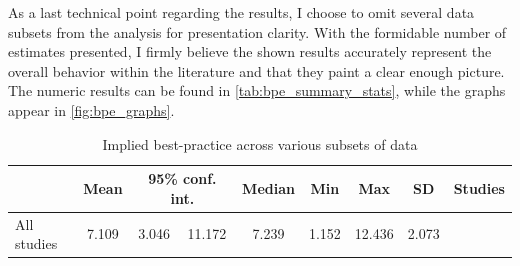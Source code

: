 As a last technical point regarding the results, I choose to omit several data subsets from the analysis for presentation clarity. With the formidable number of estimates presented, I firmly believe the shown results accurately represent the overall behavior within the literature and that they paint a clear enough picture. The numeric results can be found in \autoref{tab:bpe_summary_stats}, while the graphs appear in \autoref{fig:bpe_graphs}.


\begin{table}[!htbp]
\centering
\scriptsize
\singlespace
\caption{Implied best-practice across various subsets of data}
\label{tab:bpe_summary_stats}
\begin{tabular}{
@{}
l %
*{7}{c} %
>{\centering\arraybackslash}p{1cm} %
@{}
}
\toprule
    & Mean & \multicolumn{2}{c}{95\% conf. int.} & Median & Min & Max & SD & Studies \\
  
\midrule

                           All studies & 7.109 & 3.046   & 11.172  & 7.239 & 1.152 & 12.436 & 2.073 & 115 \\
    \midrule
    

\end{tabular}
\end{table}
